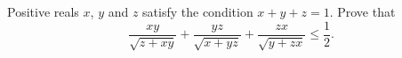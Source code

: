 \problem{}
Positive reals $x$, $y$ and $z$ satisfy the condition $x + y + z = 1$.
Prove that
\[
    \frac{x y}{\sqrt{z + x y}}
    +
    \frac{y z}{\sqrt{x + y z}}
    +
    \frac{z x}{\sqrt{y + z x}}
\leq
    \frac{1}{2}
.\]

\solution

\endproblem
